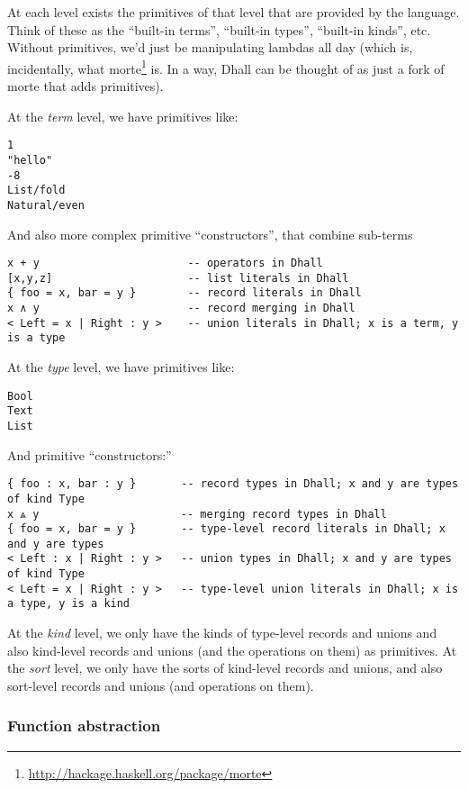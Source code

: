\documentclass[]{article}
\renewcommand{\href}[2]{#2\footnote{\url{#1}}}
\begin{document}
At each level exists the primitives of that level that are provided by the
language. Think of these as the ``built-in terms'', ``built-in types'',
``built-in kinds'', etc. Without primitives, we'd just be manipulating lambdas
all day (which is, incidentally, what
\href{http://hackage.haskell.org/package/morte}{morte} is. In a way, Dhall can
be thought of as just a fork of morte that adds primitives).

At the \emph{term} level, we have primitives like:

\begin{verbatim}
1
"hello"
-8
List/fold
Natural/even
\end{verbatim}

And also more complex primitive ``constructors'', that combine sub-terms

\begin{verbatim}
x + y                       -- operators in Dhall
[x,y,z]                     -- list literals in Dhall
{ foo = x, bar = y }        -- record literals in Dhall
x ∧ y                       -- record merging in Dhall
< Left = x | Right : y >    -- union literals in Dhall; x is a term, y is a type
\end{verbatim}

At the \emph{type} level, we have primitives like:

\begin{verbatim}
Bool
Text
List
\end{verbatim}

And primitive ``constructors:''

\begin{verbatim}
{ foo : x, bar : y }       -- record types in Dhall; x and y are types of kind Type
x ⩓ y                      -- merging record types in Dhall
{ foo = x, bar = y }       -- type-level record literals in Dhall; x and y are types
< Left : x | Right : y >   -- union types in Dhall; x and y are types of kind Type
< Left = x | Right : y >   -- type-level union literals in Dhall; x is a type, y is a kind
\end{verbatim}

At the \emph{kind} level, we only have the kinds of type-level records and
unions and also kind-level records and unions (and the operations on them) as
primitives. At the \emph{sort} level, we only have the sorts of kind-level
records and unions, and also sort-level records and unions (and operations on
them).

\hypertarget{function-abstraction}{%
\subsubsection{Function abstraction}\label{function-abstraction}}
\end{document}
